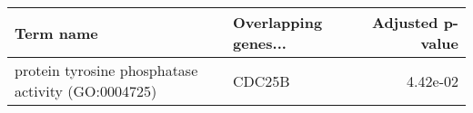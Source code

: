 \begin{tabular}{llr}
\toprule
                                         Term name & Overlapping genes... &  Adjusted p-value \\
\midrule
protein tyrosine phosphatase activity (GO:0004725) &               CDC25B &          4.42e-02 \\
\bottomrule
\end{tabular}
